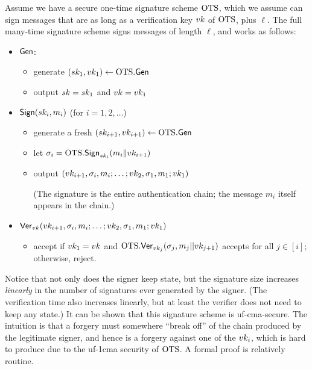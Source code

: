 \documentclass[11pt]{article}
\begin{document}
Assume we have a secure one-time signature scheme $\text{OTS}$, which we
assume can sign messages that are as long as a verification key $vk$
of $\text{OTS}$, plus $\ell$.  The full many-time signature scheme signs
messages of length $\ell$, and works as follows:

\begin{itemize}
\item $\mathsf{Gen}$:
  \begin{itemize}
  \item generate $(sk_1,vk_1) \gets \text{OTS}.\mathsf{Gen}$
  \item output $sk = sk_1$ and $vk = vk_1$
  \end{itemize}

\item $\mathsf{Sign}(sk_i,m_i)$ (for $i=1,2, \ldots$)
  \begin{itemize}
  \item generate a fresh $(sk_{i+1}, vk_{i+1}) \gets \text{OTS}.\mathsf{Gen}$
  \item let $\sigma_i = \text{OTS}.\mathsf{Sign}_{sk_{i}}(m_i \| vk_{i+1})$
  \item output $(vk_{i+1}, \sigma_{i}, m_{i}; \ldots; vk_{2},
    \sigma_1, m_1; vk_1)$

    (The signature is the entire authentication chain; the message
    $m_{i}$ itself appears in the chain.)
  \end{itemize}

\item $\mathsf{Ver}_{vk}(vk_{i+1}, \sigma_i,m_i; \ldots; vk_{2},
  \sigma_1, m_1; vk_1)$
  \begin{itemize}
  \item accept if $vk_{1} = vk$ and
    $\text{OTS}.\mathsf{Ver}_{vk_{j}}(\sigma_{j}, m_j||vk_{j+1})$ accepts for
    all $j \in [i]$; otherwise, reject.
  \end{itemize}
\end{itemize}

Notice that not only does the signer keep state, but the signature
size increases \emph{linearly} in the number of signatures ever
generated by the signer.  (The verification time also increases
linearly, but at least the verifier does not need to keep any state.)
It can be shown that this signature scheme is uf-cma-secure.  The
intuition is that a forgery must somewhere ``break off'' of the chain
produced by the legitimate signer, and hence is a forgery against one
of the $vk_{i}$, which is hard to produce due to the uf-1cma security
of $\text{OTS}$.  A formal proof is relatively routine.
\end{document}
